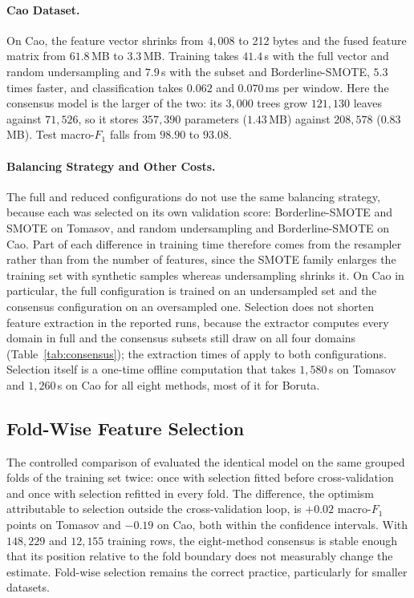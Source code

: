 \paragraph[Cao Dataset]{Cao Dataset.}
On Cao, the feature vector shrinks from $4{,}008$ to 212 bytes and the fused feature matrix from $61.8$\,MB to $3.3$\,MB. Training takes $41.4$\,s with the full vector and random undersampling and $7.9$\,s with the subset and Borderline-SMOTE, $5.3$ times faster, and classification takes $0.062$ and $0.070$\,ms per window. Here the consensus model is the larger of the two: its $3{,}000$ trees grow $121{,}130$ leaves against $71{,}526$, so it stores $357{,}390$ parameters ($1.43$\,MB) against $208{,}578$ ($0.83$\,MB). Test macro-$F_1$ falls from $98.90$ to $93.08$.

\paragraph[Balancing Strategy and Other Costs]{Balancing Strategy and Other Costs.}
The full and reduced configurations do not use the same balancing strategy, because each was selected on its own validation score: Borderline-SMOTE and SMOTE on Tomasov, and random undersampling and Borderline-SMOTE on Cao. Part of each difference in training time therefore comes from the resampler rather than from the number of features, since the SMOTE family enlarges the training set with synthetic samples whereas undersampling shrinks it. On Cao in particular, the full configuration is trained on an undersampled set and the consensus configuration on an oversampled one. Selection does not shorten feature extraction in the reported runs, because the extractor computes every domain in full and the consensus subsets still draw on all four domains (Table~\ref{tab:consensus}); the extraction times of  apply to both configurations. Selection itself is a one-time offline computation that takes $1{,}580$\,s on Tomasov and $1{,}260$\,s on Cao for all eight methods, most of it for Boruta.

\subsection{Fold-Wise Feature Selection}
\label{sec:resSelectionBias}
The controlled comparison of  evaluated the identical model on the same grouped folds of the training set twice: once with selection fitted before cross-validation and once with selection refitted in every fold. The difference, the optimism attributable to selection outside the cross-validation loop, is $+0.02$ macro-$F_1$ points on Tomasov and $-0.19$ on Cao, both within the confidence intervals. With $148{,}229$ and $12{,}155$ training rows, the eight-method consensus is stable enough that its position relative to the fold boundary does not measurably change the estimate. Fold-wise selection remains the correct practice, particularly for smaller datasets.

